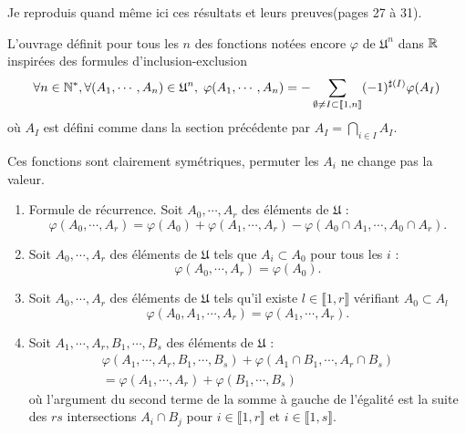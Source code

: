 Je reproduis quand même ici ces résultats et leurs preuves(pages 27 à 31).

L'ouvrage définit pour tous les $n$ des fonctions notées encore $\varphi$ de $\mathfrak{U}^n$ dans $\mathbb{R}$ inspirées des formules d'inclusion-exclusion
\begin{displaymath}
  \forall n \in \mathbb{N}^*, \forall (A_1,\cdots, A_n) \in \mathfrak{U}^n, \;
  \varphi(A_1, \cdots, A_n) = - \sum_{\emptyset \neq I \subset \llbracket 1 , n\rrbracket}(-1)^{\sharp(I)}\varphi(A_I)
\end{displaymath}
où $A_I$ est défini comme dans la section précédente par $A_I = \bigcap_{i\in I} A_I$.
\begin{rem}
  Ces fonctions sont clairement symétriques, permuter les $A_i$ ne change pas la valeur.
\end{rem}

\begin{prop}
  \begin{enumerate}
    \item Formule de récurrence. Soit $A_0, \cdots, A_r$ des éléments de $\mathfrak{U}$ :
    \begin{displaymath}
      \varphi(A_0,\cdots, A_r) = \varphi(A_0) + \varphi(A_1,\cdots, A_r) - \varphi(A_0\cap A_1, \cdots, A_0\cap A_r).
    \end{displaymath}
    \item Soit $A_0, \cdots, A_r$ des éléments de $\mathfrak{U}$ tels que $A_i \subset A_0$ pour tous les $i$ :
    \begin{displaymath}
      \varphi(A_0,\cdots, A_r) = \varphi(A_0).
    \end{displaymath}
    \item Soit $A_0, \cdots, A_r$ des éléments de $\mathfrak{U}$ tels qu'il existe $l \in \llbracket 1, r \rrbracket$ vérifiant $A_0 \subset A_l$
    \begin{displaymath}
      \varphi(A_0,A_1, \cdots,A_r) = \varphi(A_1, \cdots,A_r).
    \end{displaymath}
    \item Soit $A_1, \cdots, A_r, B_1, \cdots, B_s$ des éléments de $\mathfrak{U}$ :
    \begin{align*}
      \varphi(A_1, \cdots, A_r, B_1, \cdots, B_s) + \varphi(A_1\cap B_1, \cdots, A_r\cap B_s) \\
      = \varphi(A_1,\cdots,A_r) + \varphi(B_1, \cdots, B_s)
    \end{align*}
où l'argument du second terme de la somme à gauche de l'égalité est la suite des $rs$ intersections $A_i \cap B_j$ pour $i \in \llbracket 1,r \rrbracket$ et $i \in \llbracket 1,s \rrbracket$.
  \end{enumerate}
\end{prop}

